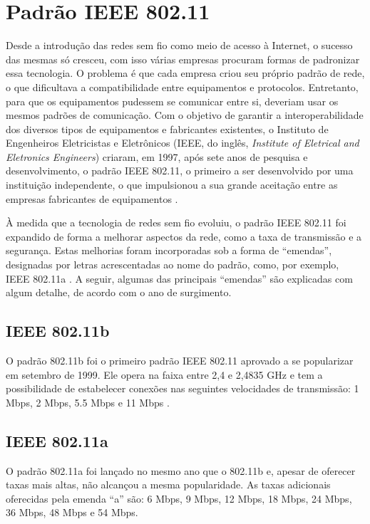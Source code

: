 \section{Padrão IEEE 802.11}
\label{padrao-ieee-802-11}

Desde a introdução das redes sem fio como meio de acesso à Internet, o sucesso das mesmas só cresceu, com isso várias empresas procuram formas de padronizar essa tecnologia. O problema é que cada empresa criou seu próprio padrão de rede, o que dificultava a compatibilidade entre equipamentos e protocolos.
Entretanto, para que os equipamentos pudessem se comunicar entre si, deveriam usar os mesmos padrões de comunicação. Com o objetivo de garantir a interoperabilidade dos diversos tipos de equipamentos e fabricantes existentes, o Instituto de Engenheiros Eletricistas e Eletrônicos (IEEE, do inglês, \textit{Institute of Eletrical and Eletronics Engineers}) criaram, em 1997, após sete anos de pesquisa e desenvolvimento, o padrão IEEE 802.11, o primeiro a ser desenvolvido por uma instituição independente, o que impulsionou a sua grande aceitação entre as empresas fabricantes de equipamentos \cite{fluminense2010}.

À medida que a tecnologia de redes sem fio evoluiu, o padrão IEEE 802.11 foi expandido de forma a melhorar aspectos da rede, como a taxa de transmissão e a segurança. Estas melhorias foram incorporadas sob a forma de ``emendas'', designadas por letras acrescentadas ao nome do padrão, como, por exemplo, IEEE 802.11a \cite{fluminense2010}. A seguir, algumas das principais ``emendas'' são explicadas com algum detalhe, de acordo com o ano de surgimento.

\subsection{IEEE 802.11b}
\label{802-11b}

O padrão 802.11b foi o primeiro padrão IEEE 802.11 aprovado a se popularizar em setembro de 1999. Ele opera na faixa entre 2,4 e 2,4835 GHz e tem a possibilidade de estabelecer conexões nas seguintes velocidades de transmissão: 1 Mbps, 2 Mbps, 5.5 Mbps e 11 Mbps \cite{moraes2010,fluminense2010}.

\subsection{IEEE 802.11a}
\label{802-11a}

O padrão 802.11a foi lançado no mesmo ano que o 802.11b e, apesar de oferecer taxas mais altas, não alcançou a mesma popularidade. As taxas adicionais oferecidas pela emenda “a” são: 6 Mbps, 9 Mbps, 12 Mbps, 18 Mbps, 24 Mbps, 36 Mbps, 48 Mbps e 54 Mbps.

